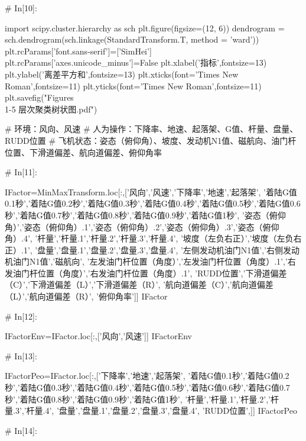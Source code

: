 \documentclass{MathorCupModeling}
\begin{document}
\begin{python}
# In[10]:


import scipy.cluster.hierarchy as sch
plt.figure(figsize=(12, 6))
dendrogram = sch.dendrogram(sch.linkage(StandardTransform.T, method = 'ward'))
plt.rcParams['font.sans-serif']=['SimHei']
plt.rcParams['axes.unicode_minus']=False
plt.xlabel('指标',fontsize=13)
plt.ylabel('离差平方和',fontsize=13)
plt.xticks(font='Times New Roman',fontsize=11)
plt.yticks(font='Times New Roman',fontsize=11)
plt.savefig("Figures\\1-5 层次聚类树状图.pdf")


# 环境：风向、风速
# 人为操作：下降率、地速、起落架、G值、杆量、盘量、RUDD位置
# 飞机状态：姿态（俯仰角）、坡度、发动机N1值、磁航向、油门杆位置、下滑道偏差、航向道偏差、俯仰角率

# In[11]:


IFactor=MinMaxTransform.loc[:,['风向','风速','下降率','地速','起落架',
                               '着陆G值0.1秒','着陆G值0.2秒','着陆G值0.3秒','着陆G值0.4秒','着陆G值0.5秒','着陆G值0.6秒','着陆G值0.7秒','着陆G值0.8秒','着陆G值0.9秒','着陆G值1秒',
                               '姿态（俯仰角）','姿态（俯仰角）.1','姿态（俯仰角）.2','姿态（俯仰角）.3','姿态（俯仰角）.4',
                               '杆量','杆量.1','杆量.2','杆量.3','杆量.4',
                               '坡度（左负右正）','坡度（左负右正）.1',
                               '盘量','盘量.1','盘量.2','盘量.3','盘量.4',
                               '左侧发动机油门N1值','右侧发动机油门N1值','磁航向',
                               '左发油门杆位置（角度）','左发油门杆位置（角度）.1','右发油门杆位置（角度）','右发油门杆位置（角度）.1',
                               'RUDD位置','下滑道偏差（C）','下滑道偏差（L）','下滑道偏差（R）',
                               '航向道偏差（C）','航向道偏差（L）','航向道偏差（R）',
                               '俯仰角率']]
IFactor


# In[12]:


IFactorEnv=IFactor.loc[:,['风向','风速']]
IFactorEnv


# In[13]:


IFactorPeo=IFactor.loc[:,['下降率','地速','起落架',
                          '着陆G值0.1秒','着陆G值0.2秒','着陆G值0.3秒','着陆G值0.4秒','着陆G值0.5秒','着陆G值0.6秒','着陆G值0.7秒','着陆G值0.8秒','着陆G值0.9秒','着陆G值1秒',
                          '杆量','杆量.1','杆量.2','杆量.3','杆量.4',
                          '盘量','盘量.1','盘量.2','盘量.3','盘量.4',
                          'RUDD位置',]]
IFactorPeo


# In[14]:



\end{python}
\end{document}
